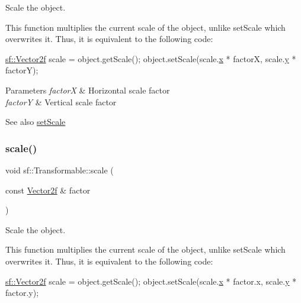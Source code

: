 Scale the object. 

This function multiplies the current scale of the object, unlike set\+Scale which overwrites it. Thus, it is equivalent to the following code\+: 
\begin{DoxyCode}
\hyperlink{classsf_1_1_vector2}{sf::Vector2f} scale = \textcolor{keywordtype}{object}.getScale();
\textcolor{keywordtype}{object}.setScale(scale.\hyperlink{classsf_1_1_vector2_a1e6ad77fa155f3753bfb92699bd28141}{x} * factorX, scale.\hyperlink{classsf_1_1_vector2_a420f2481b015f4eb929c75f2af564299}{y} * factorY);
\end{DoxyCode}



\begin{DoxyParams}{Parameters}
{\em factorX} & Horizontal scale factor \\
\hline
{\em factorY} & Vertical scale factor\\
\hline
\end{DoxyParams}
\begin{DoxySeeAlso}{See also}
\hyperlink{classsf_1_1_transformable_aaec50b46b3f41b054763304d1e727471}{set\+Scale} 
\end{DoxySeeAlso}
\mbox{\label{classsf_1_1_transformable_adecaa6c69b1f27dd5194b067d96bb694}} 
\subsubsection{\texorpdfstring{scale()}{scale()}\hspace{0.1cm}{\footnotesize\ttfamily [2/2]}}
{\footnotesize\ttfamily void sf\+::\+Transformable\+::scale (\begin{DoxyParamCaption}\item[{const \hyperlink{classsf_1_1_vector2}{Vector2f} \&}]{factor }\end{DoxyParamCaption})}



Scale the object. 

This function multiplies the current scale of the object, unlike set\+Scale which overwrites it. Thus, it is equivalent to the following code\+: 
\begin{DoxyCode}
\hyperlink{classsf_1_1_vector2}{sf::Vector2f} scale = \textcolor{keywordtype}{object}.getScale();
\textcolor{keywordtype}{object}.setScale(scale.\hyperlink{classsf_1_1_vector2_a1e6ad77fa155f3753bfb92699bd28141}{x} * factor.x, scale.\hyperlink{classsf_1_1_vector2_a420f2481b015f4eb929c75f2af564299}{y} * factor.y);
\end{DoxyCode}



